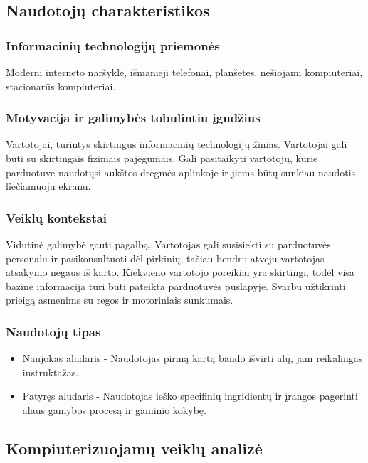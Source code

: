 \documentclass[oneside]{VUMIFPSkursinis}
\begin{document}
	\subsection{Naudotojų charakteristikos}
		\subsubsection{Informacinių technologijų priemonės} 
			Moderni interneto naršyklė, išmanieji telefonai, planšetės, nešiojami kompiuteriai, stacionarūs kompiuteriai. 
		\subsubsection{Motyvacija ir galimybės tobulintiu įgudžius}
			 Vartotojai, turintys skirtingus informacinių technologijų žinias. Vartotojai gali būti su skirtingais fiziniais pajėgumais.
			Gali pasitaikyti vartotojų, kurie parduotuve naudotųsi aukštos drėgmės aplinkoje ir jiems būtų sunkiau naudotis liečiamuoju ekranu. 
		\subsubsection{Veiklų kontekstai}
			Vidutinė galimybė gauti pagalbą.
			Vartotojas gali susisiekti su parduotuvės personalu ir pasikonsultuoti dėl pirkinių, tačiau bendru atveju vartotojas atsakymo negaus iš karto.
			Kiekvieno vartotojo poreikiai yra skirtingi, todėl visa bazinė informacija turi būti pateikta parduotuvės puslapyje.
			Svarbu užtikrinti prieigą asmenims su regos ir motoriniais sunkumais.
		\subsubsection{Naudotojų tipas}
			\begin{itemize}
				\item{Naujokas aludaris - Naudotojas pirmą kartą bando išvirti alų, jam reikalingas instruktažas.}
				\item{Patyręs aludaris - Naudotojas ieško specifinių ingridientų ir įrangos pagerinti alaus gamybos procesą ir gaminio kokybę.}
			\end{itemize}
	\subsection{Kompiuterizuojamų veiklų analizė}
\end{document}
